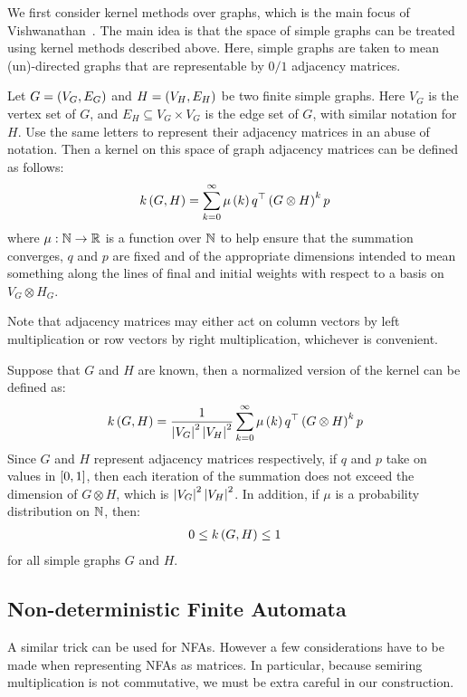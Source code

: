 \documentclass[12pt]{article}
\begin{document}
We first consider kernel methods over graphs, which is the main focus
of Vishwanathan~\cite{vishwanathan2010graph}.
The main idea is that the space of simple graphs can be treated
using kernel methods described above.
Here, simple graphs are taken to mean (un)-directed graphs
that are representable by \(0 / 1\) adjacency matrices.

Let \(G = \left(V_G, E_G\right)\) and
\(H = \left(V_H, E_H\right)\) be two finite simple graphs.
Here \(V_G\) is the vertex set of \(G\), and \(E_H \subseteq V_G \times V_G\)
is the edge set of \(G\), with similar notation for \(H\).
Use the same letters to represent their adjacency matrices in an abuse
of notation.
Then a kernel on this space of graph adjacency matrices can be
defined as follows:
\begin{align*}
  k\left(G, H\right)
    = \sum_{k = 0}^{\infty} \mu\left(k\right) q^\top \left(G \otimes H\right)^k p
\end{align*}
where \(\mu : \mathbb{N} \to \mathbb{R}\) is a function over \(\mathbb{N}\)
to help ensure that the summation converges,
\(q\) and \(p\) are fixed and of the appropriate dimensions
intended to mean something along the lines of final
and initial weights with respect to a basis on \(V_G \otimes H_G\).

Note that adjacency matrices may either act on column vectors by
left multiplication or row vectors by right multiplication,
whichever is convenient.

Suppose that \(G\) and \(H\) are known,
then a normalized version of the kernel can be defined as:
\begin{align*}
  k\left(G, H\right)
    = \frac{1}{\left\lvert V_G\right\rvert^2 \left\lvert V_H\right\rvert^2}
      \sum_{k = 0}^{\infty} \mu\left(k\right) q^\top \left(G \otimes H\right)^k p
\end{align*}
Since \(G\) and \(H\) represent adjacency matrices respectively,
if \(q\) and \(p\) take on values in \(\left[0, 1\right]\),
then each iteration of the summation does not exceed the dimension
of \(G \otimes H\),
which is \(\left\lvert V_G\right\rvert^2 \left\lvert V_H\right\rvert^2\).
In addition, if \(\mu\) is a probability distribution on \(\mathbb{N}\), then:
\begin{align*}
  0 \leq k\left(G, H\right) \leq 1
\end{align*}
for all simple graphs \(G\) and \(H\).





\subsection{Non-deterministic Finite Automata}
A similar trick can be used for NFAs.
However a few considerations have to be made when representing NFAs
as matrices.
In particular, because semiring multiplication is not commutative,
we must be extra careful in our construction.
\end{document}
